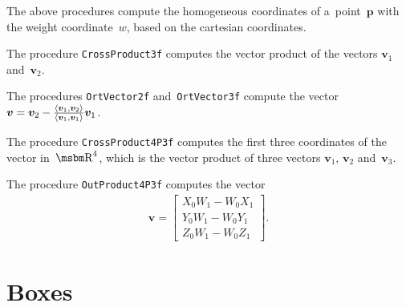 \vspace{\bigskipamount}
The above procedures compute the homogeneous coordinates of a~point~$\bm{p}$
with the weight coordinate~$w$, based on the cartesian coordinates.

\vspace{\bigskipamount}
The procedure \texttt{CrossProduct3f} computes the vector product of the
vectors
$\bm{v}_1$ and~$\bm{v}_2$.

\vspace{\bigskipamount}
The procedures \texttt{OrtVector2f} and~\texttt{OrtVector3f} compute the vector
$\bm{v}=\bm{v}_2-\frac{\langle{\bm{v}_1},{\bm{v}_2}\rangle}{\langle{\bm{v}_1},{\bm{v}_1}\rangle}\bm{v}_1$.

\vspace{\bigskipamount}
The procedure \texttt{CrossProduct4P3f} computes the first three coordinates
of the vector in~$\R^4$, which is the vector product of three vectors
$\bm{v}_1$, $\bm{v}_2$ and~$\bm{v}_3$.

\vspace{\bigskipamount}
The procedure \texttt{OutProduct4P3f} computes the vector
\begin{align*}
  \bm{v} = \left[\begin{array}{c}
     X_0W_1-W_0X_1 \\ Y_0W_1-W_0Y_1 \\ Z_0W_1-W_0Z_1
  \end{array}\right].
\end{align*}


\newpage
\section{Boxes}


